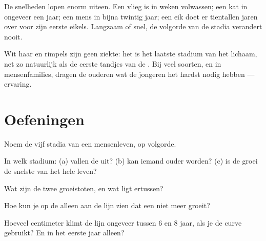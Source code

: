 \begin{example}\label{ex:g3:stages-of-life:speeds}
De snelheden lopen enorm uiteen. Een vlieg is in weken volwassen; een
kat in ongeveer een jaar; een mens in bijna twintig jaar; een eik doet
er tientallen jaren over voor zijn eerste eikels. Langzaam of snel, de
volgorde van de stadia verandert nooit.
\end{example}

\begin{remark}\label{rem:g3:stages-of-life:oldage}
Wit haar en rimpels zijn geen ziekte: het is het laatste stadium van
het lichaam, net zo natuurlijk als de eerste tandjes van de . Bij
veel soorten, en in mensenfamilies, dragen de ouderen wat de jongeren
het hardst nodig hebben --- ervaring.
\end{remark}

\section{Oefeningen}

\begin{exercise}[$\star$]\label{exo:g3:stages-of-life:1}
Noem de vijf stadia van een mensenleven, op volgorde.
\end{exercise}

\begin{exercise}[$\star$]\label{exo:g3:stages-of-life:2}
In welk stadium: (a) vallen de  uit? (b) kan iemand ouder
worden? (c) is de groei de snelste van het hele leven?
\end{exercise}

\begin{exercise}[$\star$]\label{exo:g3:stages-of-life:3}
Wat zijn de twee groeistoten, en wat ligt ertussen?
\end{exercise}

\begin{exercise}[$\star$]\label{exo:g3:stages-of-life:4}
Hoe kun je op de  alleen aan de lijn zien dat een 
niet meer groeit?
\end{exercise}

\begin{exercise}[$\star$]\label{exo:g3:stages-of-life:5}
Hoeveel centimeter klimt de lijn ongeveer tussen $6$ en $8$ jaar, als
je de curve gebruikt? En in het eerste jaar alleen?
\end{exercise}

